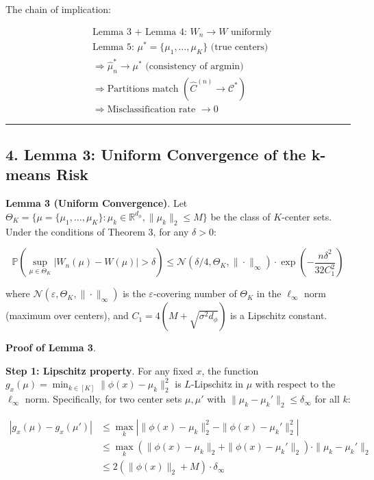 \documentclass[
  12pt,
]{article}
\begin{document}
The chain of implication:

\[\begin{aligned}
&\text{Lemma 3 + Lemma 4: } W_n \to W \text{ uniformly} \\
&\text{Lemma 5: } \mu^* = \{\mu_1,\dots,\mu_K\} \text{ (true centers)} \\
&\Rightarrow \hat{\mu}_n^* \to \mu^* \text{ (consistency of argmin)} \\
&\Rightarrow \text{Partitions match } (\hat{C}^{(n)} \to \mathcal{C}^*) \\
&\Rightarrow \text{Misclassification rate } \to 0
\end{aligned}\]

\begin{center}\rule{0.5\linewidth}{0.5pt}\end{center}

\subsection{4. Lemma 3: Uniform Convergence of the k-means
Risk}\label{lemma-3-uniform-convergence-of-the-k-means-risk}

\textbf{Lemma 3 (Uniform Convergence)}. Let
\(\Theta_K = \{\mu = \{\mu_1,\dots,\mu_K\} : \mu_k \in \mathbb{R}^{d_\phi}, \|\mu_k\|_2 \leq M\}\)
be the class of \(K\)-center sets. Under the conditions of Theorem 3,
for any \(\delta > 0\):

\[\mathbb{P}\left(\sup_{\mu \in \Theta_K} |W_n(\mu) - W(\mu)| > \delta\right) \leq \mathcal{N}(\delta/4, \Theta_K, \|\cdot\|_\infty) \cdot \exp\left(-\frac{n \delta^2}{32 C_1^2}\right)\]

where \(\mathcal{N}(\varepsilon, \Theta_K, \|\cdot\|_\infty)\) is the
\(\varepsilon\)-covering number of \(\Theta_K\) in the \(\ell_\infty\)
norm (maximum over centers), and \(C_1 = 4(M + \sqrt{\sigma^2 d_\phi})\)
is a Lipschitz constant.

\textbf{Proof of Lemma 3}.

\textbf{Step 1: Lipschitz property}. For any fixed \(x\), the function
\(g_x(\mu) = \min_{k \in [K]} \|\phi(x) - \mu_k\|_2^2\) is
\(L\)-Lipschitz in \(\mu\) with respect to the \(\ell_\infty\) norm.
Specifically, for two center sets \(\mu, \mu'\) with
\(\|\mu_k - \mu_k'\|_2 \leq \delta_\infty\) for all \(k\):

\[\begin{aligned}
|g_x(\mu) - g_x(\mu')|
&\leq \max_k \left| \|\phi(x) - \mu_k\|_2^2 - \|\phi(x) - \mu_k'\|_2^2 \right| \\
&\leq \max_k \left( \|\phi(x) - \mu_k\|_2 + \|\phi(x) - \mu_k'\|_2 \right) \cdot \|\mu_k - \mu_k'\|_2 \\
&\leq 2\left(\|\phi(x)\|_2 + M\right) \cdot \delta_\infty
\end{aligned}\]
\end{document}
